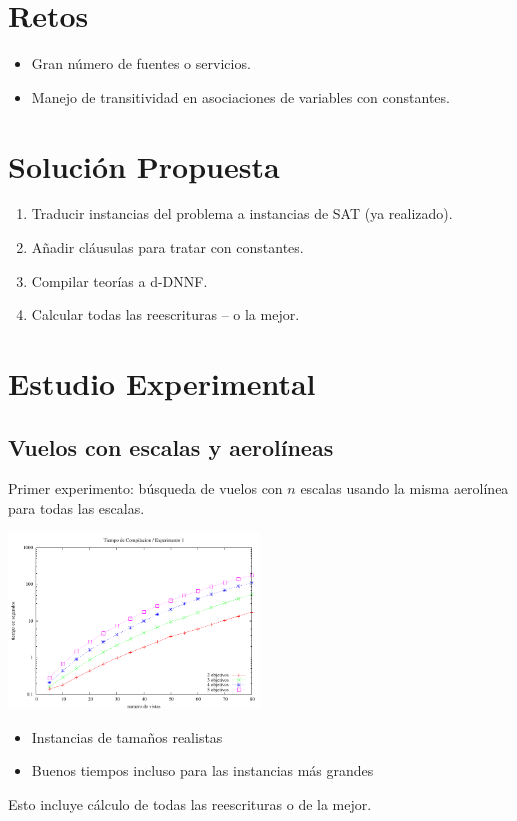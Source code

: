 \documentclass{beamer}
\begin{document}

\section{Retos}
\frame
{
\begin{itemize}
\item Gran número de fuentes o servicios.
\item Manejo de transitividad en asociaciones de variables con constantes.
\end{itemize}
}


\section{Solución Propuesta}
\frame
{
\begin{enumerate}
\item Traducir instancias del problema a instancias de SAT (ya realizado).
\item Añadir cláusulas para tratar con constantes.
\item Compilar teorías a d-DNNF.
\item Calcular todas las reescrituras -- o la mejor.
\end{enumerate}
}


\section{Estudio Experimental}

\subsection{Vuelos con escalas y aerolíneas}
\frame
{
    Primer experimento: búsqueda de vuelos con $n$ escalas usando la misma
    aerolínea para todas las escalas.
}

\frame
{

\begin{center}
\includegraphics[width=0.5\textwidth]{plot1}
\end{center}

\begin{itemize}
\item Instancias de tamaños realistas
\item Buenos tiempos incluso para las instancias más grandes
\end{itemize}

Esto incluye cálculo de todas las reescrituras o de la mejor.
}
\end{document}
